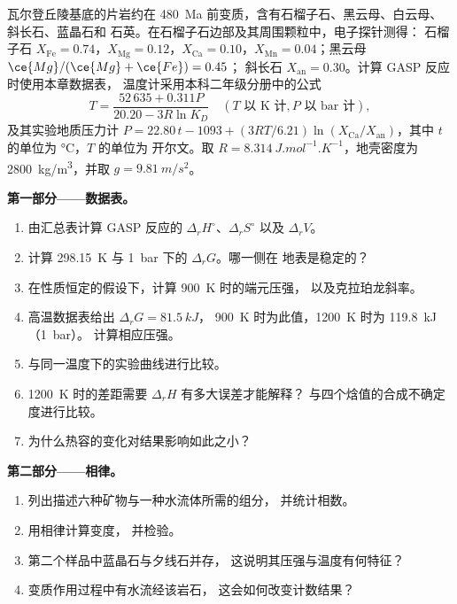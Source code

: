 \begin{problem}
\label{pb:b3:petrological-thermodynamics:1}
瓦尔登丘陵基底的片岩约在
\qty{480}{Ma} 前变质，含有石榴子石、黑云母、白云母、斜长石、蓝晶石和
石英。在石榴子石边部及其周围颗粒中，电子探针测得：
石榴子石 $X_{\text{Fe}} = 0.74$，$X_{\text{Mg}} = 0.12$，$X_{\text{Ca}} =
0.10$，$X_{\text{Mn}} = 0.04$；黑云母 $\ce{Mg}/(\ce{Mg} + \ce{Fe}) = 0.45$；
斜长石 $X_{\text{an}} = 0.30$。计算 GASP 反应时使用本章数据表，
温度计采用本科二年级分册中的公式
\[
T = \frac{52\,635 + 0.311P}{20.20 - 3R\ln K_D}\quad(T \text{ 以 K 计}, P
\text{ 以 bar 计}),
\]
及其实验地质压力计 $P = 22.80\,t - 1093 + (3RT/6.21)\ln
(X_{\text{Ca}}/X_{\text{an}})$，其中 $t$ 的单位为 \unit{\celsius}，$T$ 的单位为
开尔文。取 $R = \qty{8.314}{J.mol^{-1}.K^{-1}}$，地壳密度为
\qty{2800}{kg/m^3}，并取 $g = \qty{9.81}{m/s^2}$。

\medskip\noindent\textbf{第一部分——数据表。}
\begin{enumerate}
  \item 由汇总表计算 GASP 反应的 $\Delta_rH^\circ$、$\Delta_rS^\circ$
        以及 $\Delta_rV$。
  \item 计算 \qty{298.15}{K} 与 \qty{1}{bar} 下的 $\Delta_rG$。哪一侧在
        地表是稳定的？
  \item 在性质恒定的假设下，计算 \qty{900}{K} 时的端元压强，
        以及克拉珀龙斜率。
  \item 高温数据表给出 $\Delta_rG = \qty{81.5}{kJ}$，
        \qty{900}{K} 时为此值，\qty{1200}{K} 时为 \qty{119.8}{kJ}（\qty{1}{bar}）。
        计算相应压强。
  \item 与同一温度下的实验曲线进行比较。
  \item \qty{1200}{K} 时的差距需要 $\Delta_rH$ 有多大误差才能解释？
        与四个焓值的合成不确定度进行比较。
  \item 为什么热容的变化对结果影响如此之小？
\end{enumerate}

\medskip\noindent\textbf{第二部分——相律。}
\begin{enumerate}[resume]
  \item 列出描述六种矿物与一种水流体所需的组分，
        并统计相数。
  \item 用相律计算变度，
        并检验。
  \item 第二个样品中蓝晶石与夕线石并存，
        这说明其压强与温度有何特征？
  \item 变质作用过程中有水流经该岩石，
        这会如何改变计数结果？
\end{enumerate}


\end{problem}
